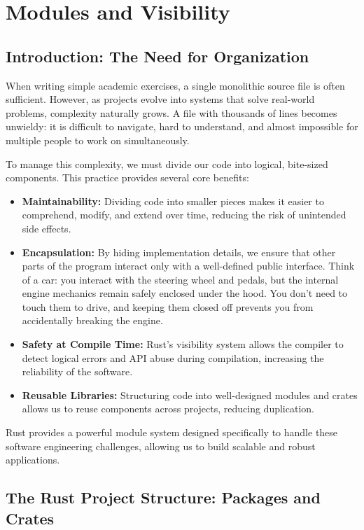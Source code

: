 \chapter{Modules and Visibility}

\section{Introduction: The Need for Organization}
When writing simple academic exercises, a single monolithic source file is often sufficient. However, as projects evolve into systems that solve real-world problems, complexity naturally grows. A file with thousands of lines becomes unwieldy: it is difficult to navigate, hard to understand, and almost impossible for multiple people to work on simultaneously. 

To manage this complexity, we must divide our code into logical, bite-sized components. This practice provides several core benefits:
\begin{itemize}
    \item \textbf{Maintainability:} Dividing code into smaller pieces makes it easier to comprehend, modify, and extend over time, reducing the risk of unintended side effects.
    \item \textbf{Encapsulation:} By hiding implementation details, we ensure that other parts of the program interact only with a well-defined public interface. Think of a car: you interact with the steering wheel and pedals, but the internal engine mechanics remain safely enclosed under the hood. You don't need to touch them to drive, and keeping them closed off prevents you from accidentally breaking the engine.
    \item \textbf{Safety at Compile Time:} Rust's visibility system allows the compiler to detect logical errors and API abuse during compilation, increasing the reliability of the software.
    \item \textbf{Reusable Libraries:} Structuring code into well-designed modules and crates allows us to reuse components across projects, reducing duplication.
\end{itemize}

Rust provides a powerful module system designed specifically to handle these software engineering challenges, allowing us to build scalable and robust applications.

\section{The Rust Project Structure: Packages and Crates}

